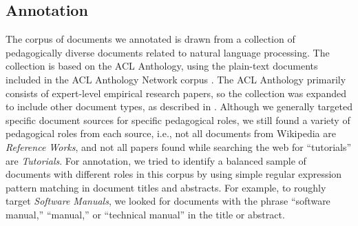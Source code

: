 \documentclass[11pt,a4paper]{article}
\begin{document}
\subsection{Annotation}

The corpus of documents we annotated is drawn from a collection of pedagogically diverse documents related to natural language processing. The collection is based on the ACL Anthology, using the plain-text documents included in the ACL Anthology Network corpus \cite{Radev&al.09a}. The ACL Anthology primarily consists of expert-level empirical research papers, so the collection was expanded to include other document types, as described in \citet{GordonEtAl2017}. %
Although we generally targeted specific document sources for specific pedagogical roles, we still found a variety of pedagogical roles from each source, i.e., not all documents from Wikipedia are \textit{Reference Works}, and not all papers found while searching the web for ``tutorials'' are \textit{Tutorials}. For annotation, we tried to identify a balanced sample of documents with different roles in this corpus by using simple regular expression pattern matching in document titles and abstracts. For example, to roughly target \textit{Software Manuals}, we looked for documents with the phrase ``software manual,'' ``manual,'' or ``technical manual'' in the title or abstract.
%
%
%
\end{document}
